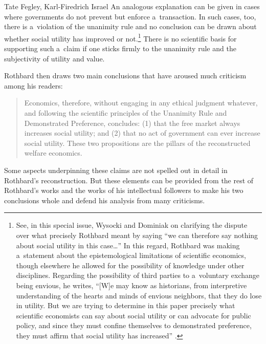 \begin{artengenv2auth}{Tate Fegley, Karl-Firedrich Israel}
An analogous explanation can be given in cases where governments do not prevent but enforce a~transaction. In such cases, too, there is a~violation of the unanimity rule and no conclusion can be drawn about whether social utility has improved or not.\footnote{See, in this special issue, Wysocki and Dominiak 
\parencite*[][]{wysocki_social_2024} %
 on clarifying the dispute over what precisely Rothbard meant by saying ``we can therefore say nothing about social utility in this case…'' In this regard, Rothbard was making a~statement about the epistemological limitations of scientific economics, though elsewhere he allowed for the possibility of knowledge under other disciplines. Regarding the possibility of third parties to a~voluntary exchange being envious, he writes, ``[W]e may know as historians, from interpretive understanding of the hearts and minds of envious neighbors, that they do lose in utility. But we are trying to determine in this paper precisely what scientific economists can say about social utility or can advocate for public policy, and since they must confine themselves to demonstrated preference, they must affirm that social utility has increased'' 
\parencite[][p.89]{rothbard_praxeology_1997}.%
} There is no scientific basis for supporting such a~claim if one sticks firmly to the unanimity rule and the subjectivity of utility and value.



Rothbard 
\parencite*[][p.323]{rothbard_toward_2011} %
 then draws two main conclusions that have aroused much criticism among his readers:



\begin{quote}
Economics, therefore, without engaging in any ethical judgment whatever, and following the scientific principles of the Unanimity Rule and Demonstrated Preference, concludes: (1) that the free market always increases social utility; and (2) that no act of government can ever increase social utility. These two propositions are the pillars of the reconstructed welfare economics.
\end{quote}
Some aspects underpinning these claims are not spelled out in detail in Rothbard's reconstruction. But these elements can be provided from the rest of Rothbard's works and the works of his intellectual followers to make his two conclusions whole and defend his analysis from many criticisms.




\end{artengenv2auth}
